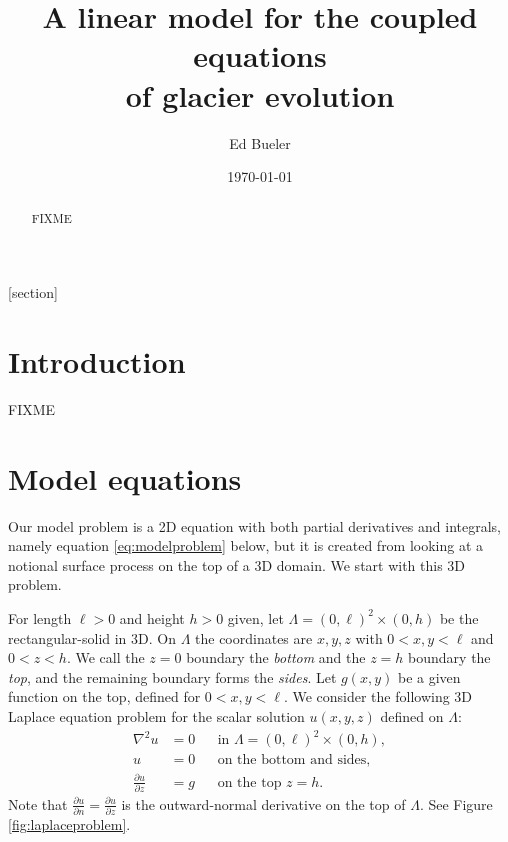 \documentclass[letterpaper,final,12pt,reqno]{amsart}
\theoremstyle{cstyle}
\theoremstyle{cstyle*}
\theoremstyle{dstyle}
\newcommand{\grad}{\nabla}
\begin{document}
\title[A linear model for the coupled equations of glacier evolution]{A linear model for the coupled equations \\ of glacier evolution}

\author{Ed Bueler}

\date{\today}

\begin{abstract} FIXME
\end{abstract}

\maketitle


\thispagestyle{empty}

[section]


\section{Introduction} \label{sec:intro}

FIXME

\section{Model equations} \label{sec:model}

Our model problem is a 2D equation with both partial derivatives and integrals, namely equation \eqref{eq:modelproblem} below, but it is created from looking at a notional surface process on the top of a 3D domain.  We start with this 3D problem.

For length $\ell>0$ and height $h>0$ given, let $\Lambda = (0,\ell)^2\times (0,h)$ be the rectangular-solid in 3D.  On $\Lambda$ the coordinates are $x,y,z$ with $0<x,y<\ell$ and $0<z<h$.  We call the $z=0$ boundary the \emph{bottom} and the $z=h$ boundary the \emph{top}, and the remaining boundary forms the \emph{sides}.  Let $g(x,y)$ be a given function on the top, defined for $0<x,y<\ell$.  We consider the following 3D Laplace equation problem for the scalar solution $u(x,y,z)$ defined on $\Lambda$:
\begin{subequations}
\label{eq:laplaceproblem}
\begin{align}
\grad^2 u &= 0 & &\text{in } \Lambda = (0,\ell)^2\times (0,h), \\
u &= 0 & &\text{on the bottom and sides}, \\
\frac{\partial u}{\partial z} &= g & &\text{on the top $z=h$}.
\end{align}
\end{subequations}
Note that $\frac{\partial u}{\partial n}=\frac{\partial u}{\partial z}$ is the outward-normal derivative on the top of $\Lambda$.  See Figure \ref{fig:laplaceproblem}.
\end{document}
